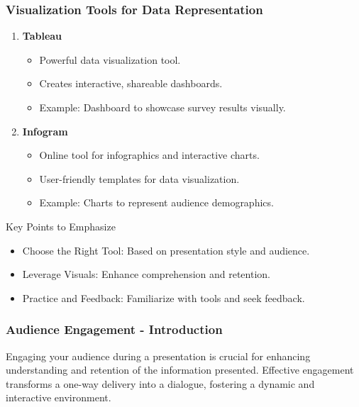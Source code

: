 \documentclass{beamer}
\begin{document}
\begin{frame}[fragile]
    \frametitle{Visualization Tools for Data Representation}
    \begin{enumerate}
        \item \textbf{Tableau}
            \begin{itemize}
                \item Powerful data visualization tool.
                \item Creates interactive, shareable dashboards.
                \item Example: Dashboard to showcase survey results visually.
            \end{itemize}
        \item \textbf{Infogram}
            \begin{itemize}
                \item Online tool for infographics and interactive charts.
                \item User-friendly templates for data visualization.
                \item Example: Charts to represent audience demographics.
            \end{itemize}
    \end{enumerate}
    
    \begin{block}{Key Points to Emphasize}
        \begin{itemize}
            \item Choose the Right Tool: Based on presentation style and audience.
            \item Leverage Visuals: Enhance comprehension and retention.
            \item Practice and Feedback: Familiarize with tools and seek feedback.
        \end{itemize}
    \end{block}
\end{frame}

\begin{frame}[fragile]
    \frametitle{Audience Engagement - Introduction}
    Engaging your audience during a presentation is crucial for enhancing understanding and retention of the information presented. Effective engagement transforms a one-way delivery into a dialogue, fostering a dynamic and interactive environment.
\end{frame}
\end{document}
